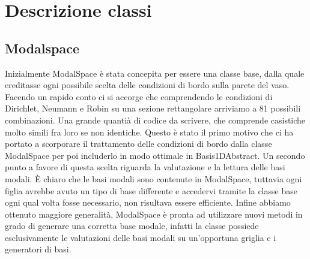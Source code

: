 \chapter{Descrizione classi}
\section{Modalspace}

Inizialmente ModalSpace \`e stata concepita per essere una classe base, dalla quale ereditasse ogni possibile scelta delle condizioni di bordo sulla parete del vaso. Facendo un rapido conto ci si accorge che comprendendo le condizioni di Dirichlet, Neumann e Robin su una sezione rettangolare arriviamo a 81 possibili combinazioni. Una grande quanti\`a di codice da scrivere, che comprende casistiche molto simili fra loro se non identiche. Questo \`e stato il primo motivo che ci ha portato a scorporare il trattamento delle condizioni di bordo dalla classe ModalSpace per poi includerlo in modo ottimale in Basis1DAbstract. Un secondo punto a favore di questa scelta riguarda la valutazione e la lettura delle basi modali. \`E chiaro che le basi modali sono contenute in ModalSpace, tuttavia ogni figlia avrebbe avuto un tipo di base differente e accedervi tramite la classe base ogni qual volta fosse necessario, non risultava essere efficiente. Infine abbiamo ottenuto maggiore generalit\`a, ModalSpace \`e pronta ad utilizzare nuovi metodi in grado di generare una corretta base modale, infatti la classe possiede esclusivamente le valutazioni delle basi modali su un'opportuna griglia e i generatori di basi.

